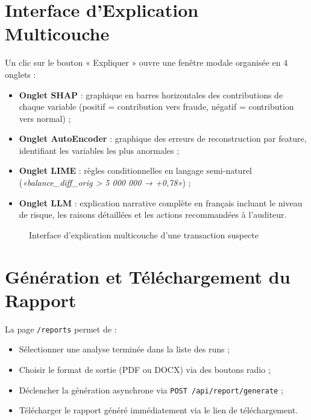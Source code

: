 \documentclass[12pt,a4paper,twoside]{report}
\theoremstyle{definition}
\begin{document}
\section{Interface d'Explication Multicouche}

Un clic sur le bouton « Expliquer » ouvre une fenêtre modale organisée en
4 onglets :

\begin{itemize}
  \item \textbf{Onglet SHAP} : graphique en barres horizontales des
    contributions de chaque variable (positif = contribution vers fraude,
    négatif = contribution vers normal) ;
  \item \textbf{Onglet AutoEncoder} : graphique des erreurs de reconstruction
    par feature, identifiant les variables les plus anormales ;
  \item \textbf{Onglet LIME} : règles conditionnelles en langage semi-naturel
    (\textit{«balance\_diff\_orig > 5 000 000 → +0,78»}) ;
  \item \textbf{Onglet LLM} : explication narrative complète en français
    incluant le niveau de risque, les raisons détaillées et les actions
    recommandées à l'auditeur.
\end{itemize}

\begin{figure}[H]
\centering
{}
\caption{Interface d'explication multicouche d'une transaction suspecte}
\label{fig:ui_explain}
\end{figure}

\section{Génération et Téléchargement du Rapport}

La page \texttt{/reports} permet de :

\begin{itemize}
  \item Sélectionner une analyse terminée dans la liste des runs ;
  \item Choisir le format de sortie (PDF ou DOCX) via des boutons radio ;
  \item Déclencher la génération asynchrone via \texttt{POST /api/report/generate} ;
  \item Télécharger le rapport généré immédiatement via le lien de téléchargement.
\end{itemize}
\end{document}
